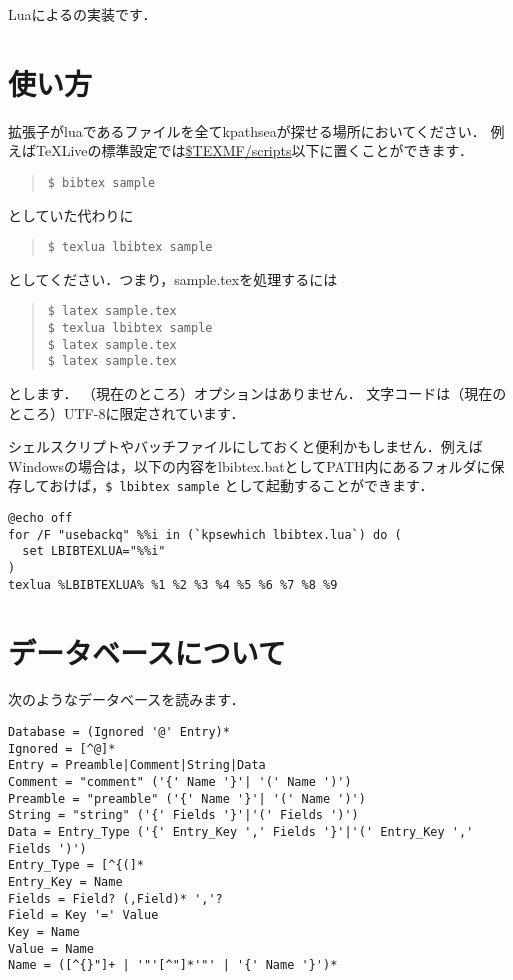 \documentclass[dvipdfmx,a4paper]{jsarticle}
\title{\LBibTeX}
\date{}
\begin{document}
\maketitle
Luaによる\BibTeX の実装です．

\section{使い方}
拡張子がluaであるファイルを全てkpathseaが探せる場所においてください．
例えばTeXLiveの標準設定では\url{$TEXMF/scripts}以下に置くことができます．

\begin{quote}
\verb|$ bibtex sample|
\end{quote}
としていた代わりに
\begin{quote}
\verb|$ texlua lbibtex sample|
\end{quote}
としてください．つまり，sample.texを処理するには
\begin{quote}
\begin{verbatim}
$ latex sample.tex
$ texlua lbibtex sample
$ latex sample.tex
$ latex sample.tex
\end{verbatim}
\end{quote}
とします．
（現在のところ）オプションはありません．
文字コードは（現在のところ）UTF-8に限定されています．

シェルスクリプトやバッチファイルにしておくと便利かもしません．例えばWindowsの場合は，以下の内容をlbibtex.batとしてPATH内にあるフォルダに保存しておけば，\verb|$ lbibtex sample|
として起動することができます．
\begin{verbatim}
@echo off
for /F "usebackq" %%i in (`kpsewhich lbibtex.lua`) do (
  set LBIBTEXLUA="%%i"
)
texlua %LBIBTEXLUA% %1 %2 %3 %4 %5 %6 %7 %8 %9
\end{verbatim}

\section{データベースについて}
次のようなデータベースを読みます．
\begin{verbatim}
Database = (Ignored '@' Entry)*
Ignored = [^@]*
Entry = Preamble|Comment|String|Data
Comment = "comment" ('{' Name '}'| '(' Name ')')
Preamble = "preamble" ('{' Name '}'| '(' Name ')')
String = "string" ('{' Fields '}'|'(' Fields ')')
Data = Entry_Type ('{' Entry_Key ',' Fields '}'|'(' Entry_Key ',' Fields ')')
Entry_Type = [^{(]*
Entry_Key = Name
Fields = Field? (,Field)* ','?
Field = Key '=' Value
Key = Name
Value = Name
Name = ([^{}"]+ | '"'[^"]*'"' | '{' Name '}')*
\end{verbatim}
\end{document}
